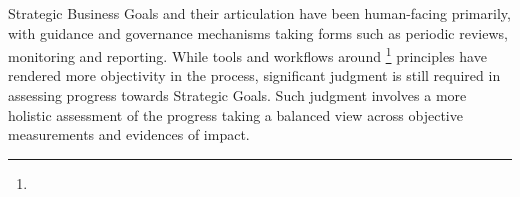 %
%

Strategic Business Goals and their articulation have been human-facing primarily,
with guidance and governance mechanisms taking forms such as periodic reviews, monitoring and reporting.
While tools and workflows around \footnote{} principles have rendered more objectivity
in the process, significant judgment is still required in assessing progress towards Strategic Goals.
Such judgment involves a more holistic assessment of the progress taking a balanced view across objective measurements
and evidences of impact.
